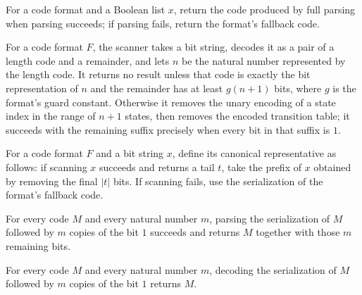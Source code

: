 \begin{definition}
\label{Turing.CodeFormat.decode}
\leanok
{}
For a code format and a Boolean list $x$, return the code produced by full parsing when
parsing succeeds; if parsing fails, return the format's fallback code.
\end{definition}

\begin{definition}
\label{Turing.CodeFormat.scan}
\leanok
{}
For a code format $F$, the scanner takes a bit string, decodes it as a pair of a length
code and a remainder, and lets $n$ be the natural number represented by the length code.
It returns no result unless that code is exactly the bit representation of $n$ and the
remainder has at least $g(n+1)$ bits, where $g$ is the format’s guard constant.
Otherwise it removes the unary encoding of a state index in the range of $n+1$ states,
then removes the encoded transition table; it succeeds with the remaining suffix
precisely when every bit in that suffix is $1$.
\end{definition}

\begin{definition}
\label{Turing.CodeFormat.canonical}
\leanok
{}
For a code format $F$ and a bit string $x$, define its canonical representative as
follows: if scanning $x$ succeeds and returns a tail $t$, take the prefix of $x$
obtained by removing the final $|t|$ bits. If scanning fails, use the serialization of
the format’s fallback code.
\end{definition}

\begin{theorem}
\label{Turing.CodeFormat.parseFull_serialize_pad}
\leanok
{}
For every code $M$ and every natural number $m$, parsing the serialization of $M$
followed by $m$ copies of the bit $1$ succeeds and returns $M$ together with those $m$
remaining bits.
\end{theorem}

\begin{theorem}
\label{Turing.CodeFormat.decode_serialize_pad}
\leanok
{}
For every code $M$ and every natural number $m$, decoding the serialization of $M$
followed by $m$ copies of the bit $1$ returns $M$.
\end{theorem}

